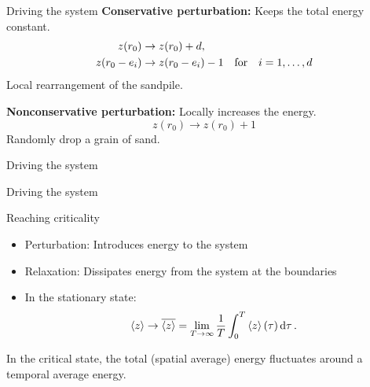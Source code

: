 \begin{frame}{Driving the system}
    \textbf{Conservative perturbation:} Keeps the total energy constant.
    \begin{align*}
        z(r_0) &\to z(r_0) + d, \\
        z(r_0-e_i) &\to z(r_0-e_i) - 1 \qq{for} i=1,\ldots,d
    \end{align*}
    Local rearrangement of the sandpile. \pause

    \textbf{Nonconservative perturbation:} Locally increases the energy.
    \begin{equation*}
        z(r_0) \to z(r_0) + 1
    \end{equation*}
    Randomly drop a grain of sand.
\end{frame}


\begin{frame}{Driving the system}
    \begin{algorithm}[H]
        \caption{Time evolution of a sandpile with a slow driving perturbation (\cite{christensen1991dynamical}).}

    \end{algorithm}
\end{frame}


\begin{frame}{Driving the system}


    \centering
\end{frame}




\begin{frame}{Reaching criticality}

    \begin{itemize}
        \item Perturbation: Introduces energy to the system
        \item Relaxation: Dissipates energy from the system at the boundaries
        \item In the stationary state: \begin{equation*}
            \expval{z} \to \overline{\expval{z}} = \lim_{T\to\infty}\frac{1}{T}\int_{0}^{T}\expval{z}(\tau)\dd{\tau}.
        \end{equation*}
    \end{itemize}

    In the critical state, the total (spatial average) energy fluctuates around a temporal average energy.

\end{frame}


